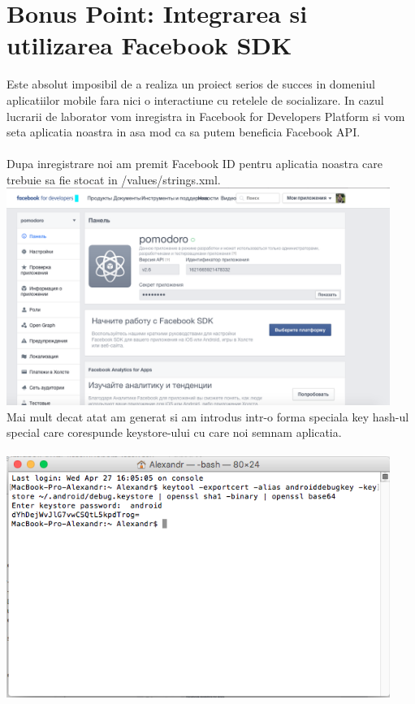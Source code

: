 \documentclass[12pt]{article}
\begin{document}
\section {Bonus Point: Integrarea si utilizarea Facebook SDK}
Este absolut imposibil de a realiza un proiect serios de succes in domeniul aplicatiilor mobile fara nici o interactiune cu retelele de socializare. In cazul lucrarii de laborator vom inregistra in Facebook for Developers Platform si vom seta aplicatia noastra in asa mod ca sa putem beneficia Facebook API.\\\\
Dupa inregistrare noi am premit Facebook ID pentru aplicatia noastra care trebuie sa fie stocat in /values/strings.xml.  \\
\includegraphics[width=12.5cm]{images/4}\\
Mai mult decat atat am generat si am introdus intr-o forma speciala key hash-ul special care corespunde keystore-ului cu care noi semnam aplicatia.\\\\
\includegraphics[width=12.5cm]{images/5}\\\\
\end{document}
